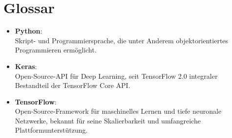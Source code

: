
\nocite{*}						%
\cleardoublepage

\listoffigures
{}   %
\cleardoublepage

\listoftables
{}		%
\cleardoublepage

\lstlistoflistings
{}%
\cleardoublepage

\chapter*{Glossar}

\begin{itemize}
	\item \textbf{Python}:\\ Skript- und Programmiersprache, die unter Anderem objektorientiertes Programmieren ermöglicht. 
	\item \textbf{Keras}:\\ Open-Source-API für Deep Learning, seit TensorFlow 2.0 integraler Bestandteil der TensorFlow Core API.
	\item \textbf{TensorFlow}:\\  Open-Source-Framework für maschinelles Lernen und tiefe neuronale Netzwerke, bekannt für seine Skalierbarkeit und umfangreiche Plattformunterstützung.
\end{itemize} 